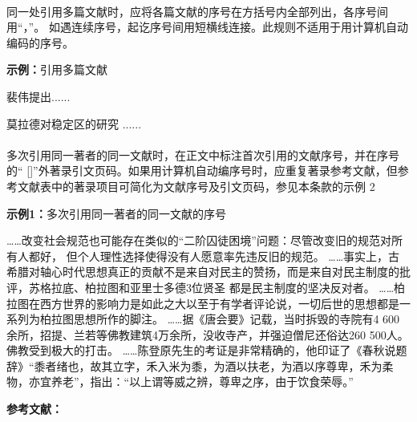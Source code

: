 \documentclass{article}
\begin{document}
\paragraph{} 同一处引用多篇文献时，应将各篇文献的序号在方括号内全部列出，各序号间用“，”。
如遇连续序号，起讫序号间用短横线连接。此规则不适用于用计算机自动编码的序号。

\begin{refsection}
\textbf{示例：}引用多篇文献

裴伟提出\cite{Humphrey1971--,KENNEDY1975-311-386}......

莫拉德对稳定区的研究
\cite{CRANE1972--,Weinstein1974-745-772,KENNEDY1975-311-386}......


\end{refsection}


\paragraph{} 多次引用同一著者的同一文献时，在正文中标注首次引用的文献序号，并在序号的“ []”外著录引文页码。如果用计算机自动编序号时，应重复著录参考文献，但参考文献表中的著录项目可简化为文献序号及引文页码，参见本条款的示例 2

\begin{refsection}
\textbf{示例1：}多次引用同一著者的同一文献的序号

……改变社会规范也可能存在类似的“二阶囚徒困境”问题：尽管改变旧的规范对所有人都好，
但个人理性选择使得没有人愿意率先违反旧的规范\cite{Sunstein1996-903-903}。
……事实上，古希腊对轴心时代思想真正的贡献不是来自对民主的赞扬，而是来自对民主制度的批评，苏格拉底、柏拉图和亚里士多德3位贤圣
都是民主制度的坚决反对者。
……柏拉图在西方世界的影响力是如此之大以至于有学者评论说，一切后世的思想都是一系列为柏拉图思想所作的脚注\cite{罗杰斯2011-15-16}。
……据《唐会要》记载，当时拆毁的寺院有4 600余所，招提、兰若等佛教建筑4万余所，没收寺产，并强迫僧尼还俗达260 500人。
佛教受到极大的打击。
……陈登原先生的考证是非常精确的，他印证了《春秋说题辞》“黍者绪也，故其立字，禾入米为黍，为酒以扶老，为酒以序尊卑，禾为柔物，亦宜养老”，指出：“以上谓等威之辨，尊卑之序，由于饮食荣辱。”\cite{陈登原2000-29-29}

\textbf{参考文献：}

\printbibliography[heading=none,env=indentegenv]
\end{refsection}
\end{document}
